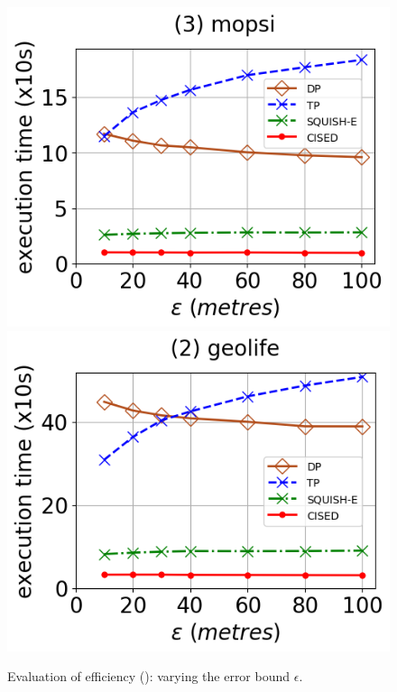 \begin{figure}[tb!]
	\includegraphics[scale=0.315]{Figures/Exp-SED-time-epsilon-mopsi.png}	\hspace{1ex}
	\includegraphics[scale=0.315]{Figures/Exp-SED-time-epsilon-geolife.png}	\hspace{1ex}
	\vspace{-2.5ex}
	\caption{\small Evaluation of efficiency (\sed): varying the error bound $\epsilon$.}\label{fig:time-epsilon-sed}
	\vspace{-2ex}
\end{figure}

